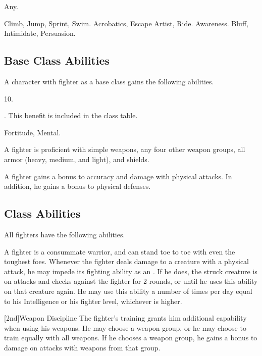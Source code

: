      Any.

     Climb, Jump, Sprint, Swim.
     Acrobatics, Escape Artist, Ride.
     Awareness.
     Bluff, Intimidate, Persuasion.

    \subsection{Base Class Abilities}
        A character with fighter as a base class gains the following abilities.

         10.

         . This benefit is included in the class table.

          Fortitude,  Mental.

        A fighter is proficient with simple weapons, any four other weapon groups,  all armor (heavy, medium, and light), and shields.

        A fighter gains a  bonus to accuracy and damage with physical attacks.
        In addition, he gains a  bonus to physical defenses.

    \subsection{Class Abilities}
        All fighters have the following abilities.

        A fighter is a consummate warrior, and can stand toe to toe with even the toughest foes.
        Whenever the fighter deals damage to a creature with a physical attack, he may impede its fighting ability as an .
        If he does, the struck creature is \impaired on attacks and checks against the fighter for 2 rounds, or until he uses this ability on that creature again.
        He may use this ability a number of times per day equal to his Intelligence or his fighter level, whichever is higher.

        [2nd]{Weapon Discipline}
        The fighter's training grants him additional capability when using his weapons.
        He may choose a weapon group, or he may choose to train equally with all weapons.
        If he chooses a weapon group, he gains a  bonus to damage on attacks with weapons from that group.

